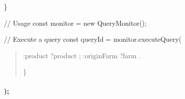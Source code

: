 \documentclass[letterpaper,10pt,english]{sphinxmanual}
\begin{document}
\sphinxAtStartPar
\}

\sphinxAtStartPar
// Usage
const monitor = new QueryMonitor();

\sphinxAtStartPar
// Execute a query
const queryId = monitor.executeQuery(\textasciigrave{}
\begin{quote}
\begin{description}
\begin{description}
\sphinxAtStartPar
:product ?product ;
:originFarm ?farm .

\end{description}

\end{description}

\sphinxAtStartPar
\}
\end{quote}


\paragraph{{\color{red}\bfseries{}\textasciigrave{}});}
\label{\detokenize{api/websocket-api:id169}}
\end{document}
